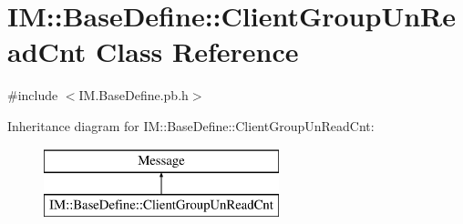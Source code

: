 \hypertarget{class_i_m_1_1_base_define_1_1_client_group_un_read_cnt}{}\section{I\+M\+:\+:Base\+Define\+:\+:Client\+Group\+Un\+Read\+Cnt Class Reference}
\label{class_i_m_1_1_base_define_1_1_client_group_un_read_cnt}


{\ttfamily \#include $<$I\+M.\+Base\+Define.\+pb.\+h$>$}

Inheritance diagram for I\+M\+:\+:Base\+Define\+:\+:Client\+Group\+Un\+Read\+Cnt\+:\begin{figure}[H]
\begin{center}
\leavevmode
\includegraphics[height=2.000000cm]{class_i_m_1_1_base_define_1_1_client_group_un_read_cnt}
\end{center}
\end{figure}
